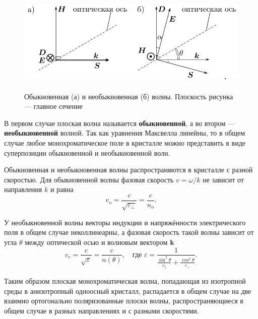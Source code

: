 \documentclass[12pt]{article}
\begin{document}
\begin{figure}[h!]
		\includegraphics[width = 15cm, height = 5cm]{image1.png}
	\caption{Обыкновенная (а) и необыкновенная (б) волны. Плоскость рисунка --- главное сечение}
\end{figure}
\par
	В первом случае плоская волна называется {\bf обыкновенной}, а во втором --- {\bf необыкновенной} волной. Так как уравнения Максвелла линейны, то в общем случае любое монохроматическое поле в кристалле можно представить в виде суперпозиции обыкновенной и необыкновенной волн.
\par
	Обыкновенная и необыкновенная волны распространяются в кристалле с разной скоростью. Для обыкновенной волны фазовая скорость $v = \omega / k$ не зависит от направления $k$ и равна
\[
	v_o = \frac{c}{\sqrt{\varepsilon_\perp}} = \frac{c}{n_o}.
\]
\par
	У необыкновенной волны векторы индукции и напряжённости электрического поля в общем случае неколлинеарны, а фазовая скорость такой волны зависит от угла $\theta$ между оптической осью и волновым вектором ${\bf k}$
\begin{equation}
	v_e = \frac{c}{\sqrt{\varepsilon}} = \frac{c}{n(\theta)}, \quad \text{где } \varepsilon = \frac{1}{\frac{\sin^2 \theta}{\varepsilon_\parallel} + \frac{\cos^2 \theta}{\varepsilon_\perp}}. \label{extra_v}
\end{equation}
\par
	Таким образом плоская монохроматическая волна, попадающая из изотропной среды в анизотропный одноосный кристалл, распадается в общем случае на две взаимно ортогонально поляризованные плоски волны, распространяющиеся в общем случае в разных направлениях и с разными скоростями.
	
\end{document}
